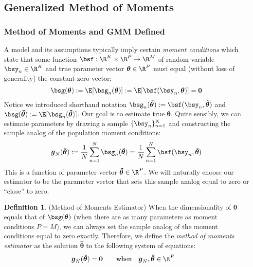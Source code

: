 \documentclass[12pt]{article}
\theoremstyle{plain}
\theoremstyle{definition}
\newtheorem{defn}[thm]{Definition}
\theoremstyle{remark}
\newcommand{\ra}{\rightarrow}
\newcommand{\bstheta}{\boldsymbol{\theta}}
\newcommand{\bshattheta}{\boldsymbol{\hat{\theta}}}
\newcommand{\bstildetheta}{\boldsymbol{\tilde{\theta}}}
\newcommand{\bsbarg}{\boldsymbol{\overline{g}}}
\renewcommand{\bso}{\boldsymbol{0}}
\newcommand{\sumnN}{\sum^N_{n=1}}
\newcommand{\nN}{_{n=1}^N}
\begin{document}
\clearpage
\subsection{Generalized Method of Moments}

\subsubsection{Method of Moments and GMM Defined}

A model and its assumptions typically imply certain \emph{moment
conditions} which state that some function
$\bsf:\R^K\times\R^P \ra \R^M$ of random variable $\bsy_n\in\R^K$ and
true parameter vector
$\bstheta \in\R^P$ must equal (without loss of generality) the constant
zero vector:
\begin{align}
  \label{populationMomentConditions}
  \bsg(\bstheta) := \E[\bsg_n(\bstheta) ]
  := \E[\bsf(\bsy_n,\bstheta)] = \bso
\end{align}
Notice we introduced shorthand notation
$\bsg_n(\bstildetheta):=\bsf(\bsy_n,\bstildetheta)$
and $\bsg(\bstildetheta):=\E[\bsg_n(\bstildetheta)]$.
Our goal is to estimate true $\bstheta$. Quite sensibly, we can estimate
parameters by drawing a sample $\{\bsy_n\}\nN$ and constructing the
sample analog of the population moment conditions:
\begin{align}
  \label{sampleMomentConditions}
  \bsbarg_N(\bstildetheta) :=
  \frac{1}{N} \sumnN \bsg_n(\bstildetheta)
  =
  \frac{1}{N} \sumnN \bsf(\bsy_n,\bstildetheta)
\end{align}
This is a function of parameter vector $\bstildetheta\in\R^P$. We will
naturally choose our estimator to be the parameter vector that sets this
sample analog equal to zero or ``close'' to zero.

\begin{defn}(Method of Moments Estimator)
When the dimensionality of $\bstheta$ equals that of $\bsg(\bstheta)$
(when there are as many parameters as moment conditions $P=M$), we can
always set the sample analog of the moment conditions equal to zero
exactly. Therefore, we define the \emph{method of moments estimator} as
the solution $\bshattheta$ to the following system of
equations:
\begin{align*}
  \bsbarg_N(\bshattheta) &= \bso
  \qquad\text{when}\quad
  \bsbarg_N,\bshattheta \in\R^P
\end{align*}
\end{defn}
\end{document}
